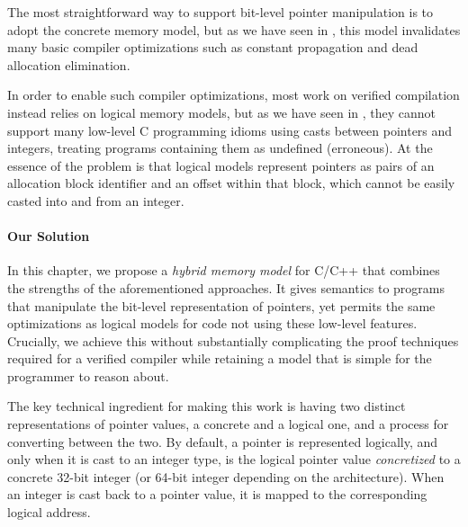 The most straightforward way to support bit-level pointer manipulation is to adopt the concrete
memory model, but as we have seen in , this model
invalidates many basic compiler optimizations such as constant propagation and dead allocation
elimination.


In order to enable such compiler optimizations, most work on verified compilation instead relies on
logical memory models, but as we have seen in , they cannot support many
low-level C programming idioms using casts between pointers and integers, treating programs
containing them as undefined (\ie erroneous).  At the essence of the problem is that logical models
represent pointers as pairs of an allocation block identifier and an offset within that block, which
cannot be easily casted into and from an integer.


\paragraph{Our Solution}

In this chapter, we propose a \emph{hybrid memory model} for C/C++ that combines the strengths of the
aforementioned approaches. It gives semantics to programs that manipulate the bit-level
representation of pointers, yet permits the same optimizations as logical models for code not using
these low-level features. Crucially, we achieve this without substantially complicating the proof
techniques required for a verified compiler while retaining a model that is simple for the
programmer to reason about.

The key technical ingredient for making this work is having two
distinct representations of pointer values, a concrete and a logical one,
and a process for converting between the two.
By default, a pointer is represented logically, and only when it is
cast to an integer type, is the logical pointer value
\emph{concretized} to a concrete 32-bit integer (or 64-bit integer depending on the architecture).
When an integer is cast back to a pointer value, 
it is mapped to the corresponding logical address.

